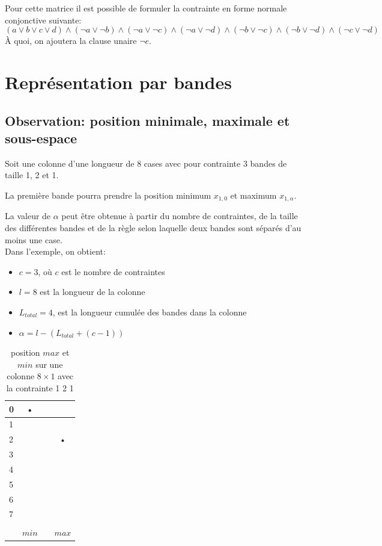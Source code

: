 \documentclass[a4paper,12pt]{report}
\newcommand\black{\cellcolor{black}}
\newcommand\grey{\cellcolor{black!50}}
\begin{document}
Pour cette matrice il est possible de formuler la contrainte en forme normale conjonctive suivante:
$$ (a \vee b \vee c \vee d ) \wedge (\lnot a \vee \lnot b) \wedge (\lnot a \vee \lnot c) \wedge (\lnot a \vee \lnot d)\wedge (\lnot b \vee \lnot c) \wedge (\lnot b \vee \lnot d)\wedge (\lnot c \vee \lnot d)$$   
À quoi, on ajoutera la clause unaire $\lnot e$.
	

\section{Représentation par bandes}
\subsection{Observation: position minimale, maximale et sous-espace}

Soit une colonne d'une longueur de 8 cases avec pour contrainte 3 bandes de taille 1, 2 et 1.

La première bande pourra prendre la position minimum $x_{1,0}$ et maximum $x_{1,\alpha}$.

La valeur de $\alpha$ peut être obtenue à partir du nombre de contraintes, de la taille des différentes bandes et de la règle selon laquelle deux bandes sont séparés d'au moins une case.\\

Dans l'exemple, on obtient:
\begin{itemize}
\item[] $c = 3$, où $c$ est le nombre de contraintes
\item[] $l = 8$ est la longueur de la colonne
\item[] $L_{total} = 4$, est la longueur cumulée des bandes dans la colonne
\item[] $\alpha = l-(L_{total}+(c-1))$
\end{itemize}

\begin{table}[H]
\centering
\begin{tabular}{|l||c|c|c|}
\hline 
0&\black • &  &  \\ 
\hline 
1 & &  &  \\ 
\hline 
2 & \grey &  & \black • \\ 
\hline 
3&\grey &  & \\ 
\hline 
4&\grey &  & \grey \\ 
\hline 
5&\grey &  & \grey \\ 
\hline 
6&\grey &  & \grey \\ 
\hline 
7&\grey &  & \grey \\ 
\hline &&\\
[-1.3em]\hline
&$min$ &  & $max$ \\ 
\hline 
\end{tabular} 
\caption{\label{bande8X1} position $max$ et $min$ sur une colonne $8\times1$ avec la contrainte 1 2 1}
\end{table}
\end{document}
